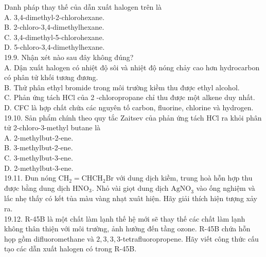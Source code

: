 \documentclass[10pt]{article}
\begin{document}
Danh pháp thay thế của dẫn xuất halogen trên là\\
A. 3,4-dimethyl-2-chlorohexane.\\
B. 2-chloro-3,4-dimethylhexane.\\
C. 3,4-dimethyl-5-chlorohexane.\\
D. 5-chloro-3,4-dimethylhexane.\\
19.9. Nhận xét nào sau đây không đúng?\\
A. Dận xuất halogen có nhiệt độ sôi và nhiệt độ nóng chảy cao hơn hydrocarbon có phân tử khối tương đương.\\
B. Thử phân ethyl bromide trong môi trường kiềm thu được ethyl alcohol.\\
C. Phản ứng tách HCl của 2 -chloropropane chỉ thu được một alkene duy nhất.\\
D. CFC là hợp chất chứa các nguyên tố carbon, fluorine, chlorine và hydrogen.\\
19.10. Sån phẩm chính theo quy tắc Zaitsev của phản ứng tách HCl ra khỏi phân tử 2-chloro-3-methyl butane là\\
A. 2-methylbut-2-ene.\\
B. 3-methylbut-2-ene.\\
C. 3-methylbut-3-ene.\\
D. 2-methylbut-3-ene.\\
19.11. Đun nóng $\mathrm{CH}_{2}=\mathrm{CHCH}_{2} \mathrm{Br}$ với dung dịch kiềm, trung hoà hỗn hợp thu được bằng dung dịch $\mathrm{HNO}_{3}$. Nhỏ vài giọt dung dịch $\mathrm{AgNO}_{3}$ vào ống nghiệm và lấc nhẹ thấy có kết tủa màu vàng nhạt xuât hiện. Hãy giải thích hiện tượng xảy ra.\\
19.12. R-45B là một chất làm lạnh thế hệ mới sẽ thay thế các chất làm lạnh không thân thiện với môi trường, ảnh hưởng đến tầng ozone. R-45B chứa hỗn họp gồm difluoromethane và $2,3,3,3$-tetrafluoropropene. Hãy viết công thức cấu tạo các dẫn xuất halogen có trong R-45B.
\end{document}
